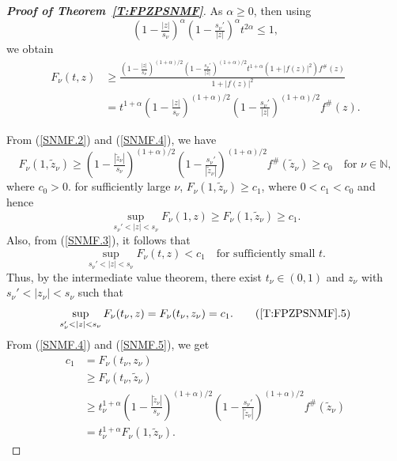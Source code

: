 \documentclass[11pt, reqno]{amsart}
\theoremstyle{definition}
\theoremstyle{remark}
\numberwithin{equation}{section}
\begin{document}
\begin{proof}[{\bf Proof of Theorem~\ref{T:FPZPSNMF}}]
As $\alpha\geq0$, then using
\begin{equation*}
\left(1-\tfrac{|z|}{s_{\nu}}\right)^{\alpha} \left(1-\tfrac{s_{\nu}'}{|z|}\right)^{\alpha} t^{2\alpha} \le 1,
\end{equation*}
we obtain
\begin{align*}    
F_{\nu}(t,z)
&\ge
\frac{\left(1-\frac{|z|}{s_{\nu}}\right)^{(1+\alpha)/2} \left(1-\frac{s_{\nu}'}{|z|}\right)^{(1+\alpha)/2}
t^{1+\alpha}(1+|f(z)|^{2})f^{\#}(z)}{1+|f(z)|^{2}}
\\ 
&=
t^{1+\alpha}
\left(1-\tfrac{|z|}{s_{\nu}}\right)^{(1+\alpha)/2} \left(1-\tfrac{s_{\nu}'}{|z|}\right)^{(1+\alpha)/2}
f^{\#}(z).
\end{align*}

From (\ref{SNMF.2}) and (\ref{SNMF.4}), we have
\begin{equation*}
F_{\nu}(1,\tilde{z}_{\nu})
\ge
\left(1-\tfrac{|\tilde{z}_{\nu}|}{s_{\nu}}\right)^{(1+\alpha)/2} \left(1-\tfrac{s_{\nu}'}{|\tilde{z}_{\nu}|}\right)^{(1+\alpha)/2}
f^{\#}(\tilde{z}_{\nu})
\geq c_0 \quad \text{for } \nu \in\mathbb N,
\end{equation*} where $c_0>0$.
for sufficiently large $\nu$, $F_{\nu}(1,\tilde{z}_{\nu})\geq c_1$, where $0<c_1<c_0$ and hence
\begin{equation*}
\sup_{s_{\nu}'<|z|<s_{\nu}} F_{\nu}(1,z)\geq F_{\nu}(1,\tilde{z}_{\nu}) \geq c_1.
\end{equation*}
Also, from (\ref{SNMF.3}), it follows that
\begin{equation*}
\sup_{s_{\nu}'<|z|<s_{\nu}} F_{\nu}(t,z) < c_1
\quad \text{for sufficiently small } t.
\end{equation*}
Thus, by the intermediate value theorem, there exist $t_{\nu}\in(0,1)$ and $z_{\nu}$
with $s_{\nu}'<|z_{\nu}|<s_{\nu}$ such that
\begin{equation}
\sup_{s_{\nu}'<|z|<s_{\nu}} F_{\nu}(t_{\nu},z) = F_{\nu}(t_{\nu},z_{\nu})=c_1 .
\tag{\ref*{T:FPZPSNMF}.5} \label{SNMF.5}
\end{equation}
From (\ref{SNMF.4}) and (\ref{SNMF.5}), we get
\begin{align*}
c_1&= F_{\nu}(t_{\nu},z_{\nu})
\\&\ge F_{\nu}(t_{\nu},\tilde{z}_{\nu})\\ &\ge
t_{\nu}^{1+\alpha}
\left(1-\tfrac{|\tilde{z}_{\nu}|}{s_{\nu}}\right)^{(1+\alpha)/2} \left(1-\tfrac{s_{\nu}'}{|\tilde{z}_{\nu}|}\right)^{(1+\alpha)/2}
f^{\#}(\tilde{z}_{\nu})
\\&=
t_{\nu}^{1+\alpha} F_{\nu}(1,\tilde{z}_{\nu}).
\end{align*}

\end{proof}
\end{document}
